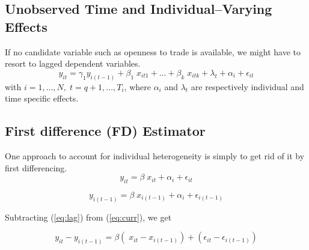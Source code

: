 \documentclass[landscape,letterpaper,9pt]{article}
\begin{document}
\subsection{Unobserved Time and Individual--Varying Effects}
If no candidate variable such as openness to trade is available, we might have to resort to
lagged dependent variables.
\[
y_{it} =\gamma_1  y_{i(t-1)} + \beta_1 \; x_{it1} + \dots+ \beta_k \; x_{itk} + \lambda_{t} +  \alpha_i +\epsilon_{it}
\]
with \(i=1, \ldots, N, \; t= q+1, \ldots, T_i\), where \(\alpha_i\) and \(\lambda_t\) are
respectively individual and time specific effects.

\newpage

\subsection{First difference (FD) Estimator}
One approach to account for individual heterogeneity is simply to get rid of it by first differencing.
\begin{equation}\label{eq:curr}
y_{it} =  \beta \; x_{it}  +  \alpha_i +\epsilon_{it}
\end{equation}

\begin{equation}\label{eq:lag}
y_{i(t-1)} =  \beta \; x_{i(t-1)}  +  \alpha_i + \epsilon_{i(t-1)}
\end{equation}

Subtracting (\ref{eq:lag}) from (\ref{eq:curr}), we get

\begin{equation*}\label{eq:diff}
y_{it} - y_{i(t-1)} =  \beta ( \; x_{it}-  x_{i(t-1)})  + (\epsilon_{it} - \epsilon_{i(t-1)})
\end{equation*}
\end{document}
